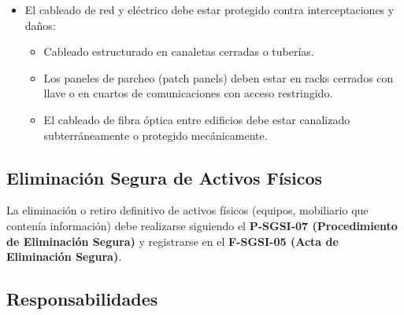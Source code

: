 \documentclass[10pt,letterpaper]{article}
\begin{document}
\begin{itemize}
\tightlist
\item
  El cableado de red y eléctrico debe estar protegido contra
  interceptaciones y daños:

  \begin{itemize}
  \tightlist
  \item
    Cableado estructurado en canaletas cerradas o tuberías.
  \item
    Los paneles de parcheo (patch panels) deben estar en racks cerrados
    con llave o en cuartos de comunicaciones con acceso restringido.
  \item
    El cableado de fibra óptica entre edificios debe estar canalizado
    subterráneamente o protegido mecánicamente.
  \end{itemize}
\end{itemize}

\subsection{Eliminación Segura de Activos
Físicos}\label{eliminaciuxf3n-segura-de-activos-fuxedsicos}

La eliminación o retiro definitivo de activos físicos (equipos,
mobiliario que contenía información) debe realizarse siguiendo el
\textbf{P-SGSI-07 (Procedimiento de Eliminación Segura)} y registrarse
en el \textbf{F-SGSI-05 (Acta de Eliminación Segura)}.

\subsection{Responsabilidades}\label{responsabilidades}
\end{document}
